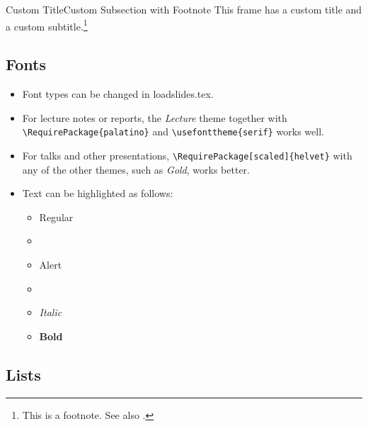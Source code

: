 \documentclass[
14pt,notheorems,hyperref={pdfauthor=whatever}
]{beamer}
\begin{document}
\begin{frame}{Custom Title}{Custom Subsection with Footnote}
    This frame has a custom title and a custom subtitle.\footnote{This is a footnote. See also \citet{example_2022}. }
\end{frame}

\subsection{Fonts}
\begin{frame}[fragile]
\begin{itemize}
\item Font types can be changed in loadslides.tex.
    \item For lecture notes or reports, the \textit{Lecture} theme together with \verb +\RequirePackage{palatino}+ and \verb+\usefonttheme{serif}+ works well. 
    \item For talks and other presentations, \verb+\RequirePackage[scaled]{helvet}+ with any of the other themes, such as \textit{Gold}, works better.
    \item Text can be highlighted as follows:
    \begin{itemize}
        \item Regular
        \item {}
        \item \alert{Alert}
        \item {}
        \item \textit{Italic}
        \item \textbf{Bold}
    \end{itemize}
\end{itemize}
    
\end{frame}

\subsection{Lists}
\end{document}
